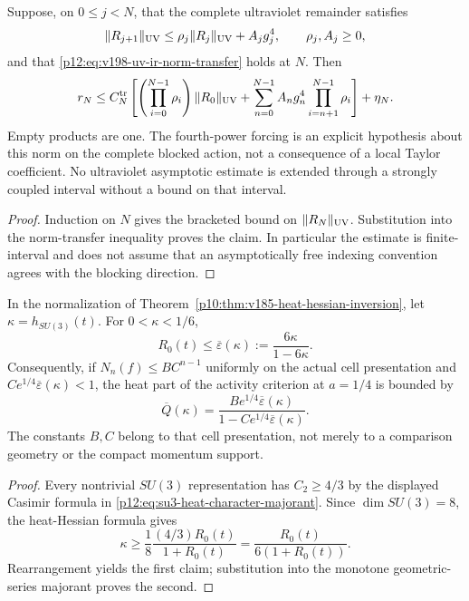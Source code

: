 \documentclass[12pt,a4paper]{article}
\begin{document}
\begin{proposition}
\label{p12:prop:v198-finite-rg-recurrence}
Suppose, on $0\le j<N$, that the complete ultraviolet remainder satisfies
\[
 \|R_{j+1}\|_{\rm UV}\le\rho_j\|R_j\|_{\rm UV}+A_jg_j^4,
 \qquad \rho_j,A_j\ge0,
\]
and that \eqref{p12:eq:v198-uv-ir-norm-transfer} holds at $N$.  Then
\begin{equation}
\label{p12:eq:v198-finite-crossover-budget}
 r_N\le C_N^{\rm tr}\left[
 \left(\prod_{i=0}^{N-1}\rho_i\right)\|R_0\|_{\rm UV}
 +\sum_{n=0}^{N-1}A_ng_n^4
       \prod_{i=n+1}^{N-1}\rho_i\right]+\eta_N.
\end{equation}
Empty products are one.  The fourth-power forcing is an explicit hypothesis
about this norm on the complete blocked action, not a consequence of a
local Taylor coefficient.  No ultraviolet asymptotic estimate is extended
through a strongly coupled interval without a bound on that interval.
\end{proposition}
\begin{proof}
Induction on $N$ gives the bracketed bound on $\|R_N\|_{\rm UV}$.
Substitution into the norm-transfer inequality proves the claim.  In
particular the estimate is finite-interval and does not assume that an
asymptotically free indexing convention agrees with the blocking direction.
\end{proof}

\begin{proposition}
\label{p12:prop:v198-stiffness-activity}
In the normalization of
Theorem~\ref{p10:thm:v185-heat-hessian-inversion}, let
$\kappa=h_{SU(3)}(t)$.  For $0<\kappa<1/6$,
\begin{equation}
\label{p12:eq:v198-stiffness-activity}
 R_0(t)\le\overline\varepsilon(\kappa)
 :=\frac{6\kappa}{1-6\kappa}.
\end{equation}
Consequently, if $N_n(f)\le BC^{n-1}$ uniformly on the actual cell
presentation and $C e^{1/4}\overline\varepsilon(\kappa)<1$, the heat part
of the activity criterion at $a=1/4$ is bounded by
\begin{equation}
\label{p12:eq:v198-heat-budget}
 \overline Q(\kappa)
 =\frac{B e^{1/4}\overline\varepsilon(\kappa)}
 {1-C e^{1/4}\overline\varepsilon(\kappa)}.
\end{equation}
The constants $B,C$ belong to that cell presentation, not merely to a
comparison geometry or the compact momentum support.
\end{proposition}
\begin{proof}
Every nontrivial $SU(3)$ representation has $C_2\ge4/3$ by the displayed
Casimir formula in \eqref{p12:eq:su3-heat-character-majorant}.  Since
$\dim SU(3)=8$, the heat-Hessian formula gives
\[
 \kappa\ge\frac18\frac{(4/3)R_0(t)}{1+R_0(t)}
 =\frac{R_0(t)}{6(1+R_0(t))}.
\]
Rearrangement yields the first claim; substitution into the monotone
geometric-series majorant proves the second.
\end{proof}
\end{document}
